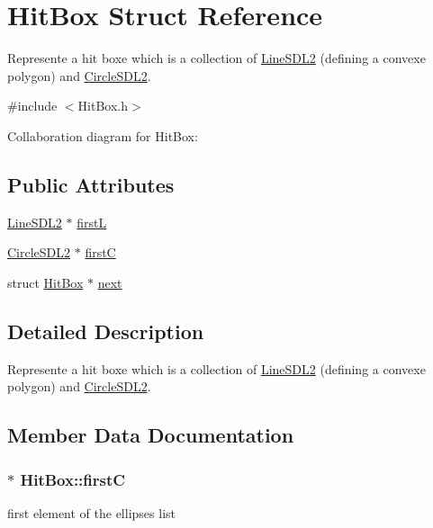\hypertarget{structHitBox}{}\section{Hit\+Box Struct Reference}
\label{structHitBox}


Represente a hit boxe which is a collection of \hyperlink{structLineSDL2}{Line\+S\+D\+L2} (defining a convexe polygon) and \hyperlink{structCircleSDL2}{Circle\+S\+D\+L2}.  




{\ttfamily \#include $<$Hit\+Box.\+h$>$}



Collaboration diagram for Hit\+Box\+:
\subsection*{Public Attributes}
\begin{DoxyCompactItemize}
\item 
\hyperlink{structLineSDL2}{Line\+S\+D\+L2} $\ast$ \hyperlink{structHitBox_a3f8b8bd82cf7afe309b505e17151fe00}{firstL}
\item 
\hyperlink{structCircleSDL2}{Circle\+S\+D\+L2} $\ast$ \hyperlink{structHitBox_ab66b0a9156c3fedd495f11c65462b128}{firstC}
\item 
struct \hyperlink{structHitBox}{Hit\+Box} $\ast$ \hyperlink{structHitBox_a2009d8cf7256da486ceebcd8213c9708}{next}
\end{DoxyCompactItemize}


\subsection{Detailed Description}
Represente a hit boxe which is a collection of \hyperlink{structLineSDL2}{Line\+S\+D\+L2} (defining a convexe polygon) and \hyperlink{structCircleSDL2}{Circle\+S\+D\+L2}. 

\subsection{Member Data Documentation}
\subsubsection[{\texorpdfstring{firstC}{firstC}}]{$\ast$ Hit\+Box\+::firstC}\hypertarget{structHitBox_ab66b0a9156c3fedd495f11c65462b128}{}\label{structHitBox_ab66b0a9156c3fedd495f11c65462b128}
first element of the ellipses\textquotesingle{} list 
